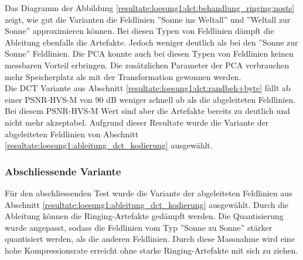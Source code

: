 Das Diagramm der Abbildung  \ref{resultate:loesung1:dct:behandlung_ringing:nosts} zeigt, wie gut die Varianten die Feldlinien ''Sonne ins Weltall'' und ''Weltall zur Sonne'' approximieren können. Bei diesen Typen von Feldlinien dämpft die Ableitung ebenfalls die Artefakte. Jedoch weniger deutlich als bei den ''Sonne zur Sonne'' Feldlinien. Die PCA konnte auch bei diesen Typen von Feldlinien keinen messbaren Vorteil erbringen. Die zusätzlichen Parameter der PCA verbrauchen mehr Speicherplatz als mit der Transformation gewonnen werden.\\
Die DCT Variante aus Abschnitt \ref{resultate:loesung1:dct:randbeh+byte} fällt ab einer PSNR-HVS-M von 90 dB weniger schnell ab als die abgeleiteten Feldlinien. Bei diesem PSNR-HVS-M Wert sind aber die Artefakte bereits zu deutlich und nicht mehr akzeptabel. Aufgrund dieser Resultate wurde die Variante der abgeleiteten Feldlinien von Abschnitt \ref{resultate:loesung1:ableitung_dct_kodierung} ausgewählt. 

\subsubsection{Abschliessende Variante}
Für den abschliessenden Test wurde die Variante der abgeleiteten Feldlinien aus Abschnitt \ref{resultate:loesung1:ableitung_dct_kodierung} ausgewählt. Durch die Ableitung können die Ringing-Artefakte gedämpft werden. Die Quantisierung wurde angepasst, sodass die Feldlinien vom Typ ''Sonne zu Sonne'' stärker quantisiert werden, als die anderen Feldlinien. Durch diese Massnahme wird eine hohe Kompressionsrate erreicht ohne starke Ringing-Artefakte mit sich zu ziehen.

